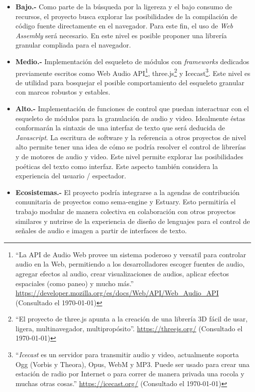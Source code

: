 \begin{itemize}


\item \textbf{Bajo.-} Como parte de la búsqueda por la ligereza y el bajo consumo de recursos, el proyecto busca explorar las posibilidades de la compilación de código fuente directamente en el navegador. Para este fin, el uso de \textit{Web Assembly} será necesario. En este nivel es posible proponer una librería granular compliada para el navegador. 
\item \textbf{Medio.-} Implementación del esqueleto de módulos con \textit{frameworks} dedicados previamente escritos como Web Audio API\footnote{``La API de Audio Web provee un sistema poderoso y versatil para controlar audio en la Web, permitiendo a los desarrolladores escoger fuentes de audio, agregar efectos al audio, crear visualizaciones de audios, aplicar efectos espaciales (como paneo) y mucho más.'' \url{https://developer.mozilla.org/es/docs/Web/API/Web_Audio_API} (Consultado el \today)}, three.js\footnote{``El proyecto de three.js apunta a la creación de una librería 3D fácil de usar, ligera, multinavegador, multipropósito''. \url{https://threejs.org/} (Consultado el \today)} y Icecast\footnote{``\textit{Icecast} es un servidor para transmitir audio y video, actualmente soporta Ogg (Vorbis y Theora), Opus, WebM y MP3. Puede ser usado para crear una estación de radio por Internet o para correr de manera privada una rocola y muchas otras cosas.'' \url{https://icecast.org/} (Consultado el \today)}. Este nivel es de utilidad para bosquejar el posible comportamiento del esqueleto granular con marcos robustos y estables. 
\item \textbf{Alto.-} Implementación de funciones de control que puedan interactuar con el esqueleto de módulos para la granulación de audio y video. Idealmente éstas conformarán la sintaxis de una interfaz de texto que será deducida de \textit{Javascript}. La escritura de software y la referencia a otros proyectos de nivel alto permite tener una idea de cómo se podría resolver el control de librerías y de motores de audio y video. Este nivel permite explorar las posibilidades poéticas del texto como interfaz. Este aspecto también considera la experiencia del usuario / espectador. 
\item \textbf{Ecosistemas.-} El proyecto podría integrarse a la agendas de contribución comunitaria de proyectos como sema-engine \citep{2019_40} y Estuary. Esto permitiría el trabajo modular de manera colectiva en colaboración con otros proyectos similares y nutrirse de la experiencia de diseño de lenguajes para el control de señales de audio e imagen a partir de interfaces de texto. 
  
\end{itemize}

